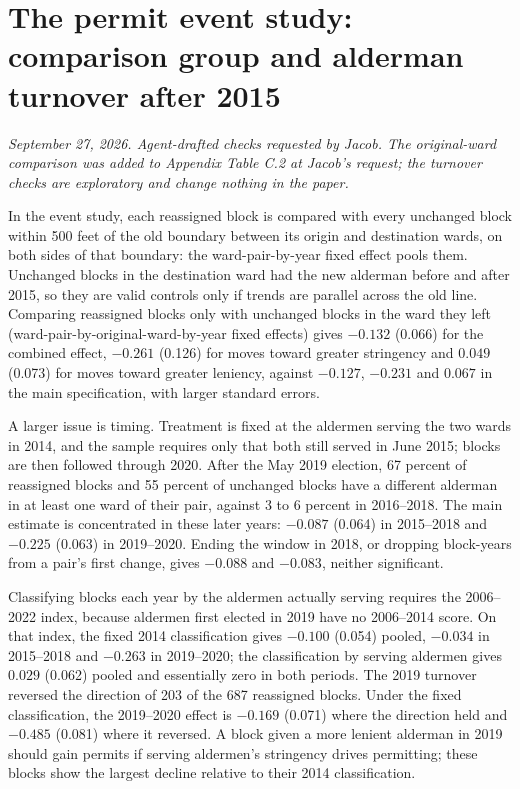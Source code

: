 \clearpage
\section*{The permit event study: comparison group and alderman turnover after 2015}
\textit{September 27, 2026. Agent-drafted checks requested by Jacob. The original-ward comparison was added to
Appendix Table C.2 at Jacob's request; the turnover checks are exploratory and change nothing in the paper.}

In the event study, each reassigned block is compared with every unchanged block within 500 feet of the old
boundary between its origin and destination wards, on both sides of that boundary: the ward-pair-by-year fixed
effect pools them. Unchanged blocks in the destination ward had the new alderman before and after 2015, so they are
valid controls only if trends are parallel across the old line. Comparing reassigned blocks only with unchanged
blocks in the ward they left (ward-pair-by-original-ward-by-year fixed effects) gives $-0.132$ (0.066) for the
combined effect, $-0.261$ (0.126) for moves toward greater stringency and $0.049$ (0.073) for moves toward greater
leniency, against $-0.127$, $-0.231$ and $0.067$ in the main specification, with larger standard errors.

A larger issue is timing. Treatment is fixed at the aldermen serving the two wards in 2014, and the sample requires
only that both still served in June 2015; blocks are then followed through 2020. After the May 2019 election, 67
percent of reassigned blocks and 55 percent of unchanged blocks have a different alderman in at least one ward of
their pair, against 3 to 6 percent in 2016--2018. The main estimate is concentrated in these later years: $-0.087$
(0.064) in 2015--2018 and $-0.225$ (0.063) in 2019--2020. Ending the window in 2018, or dropping block-years from a
pair's first change, gives $-0.088$ and $-0.083$, neither significant.

Classifying blocks each year by the aldermen actually serving requires the 2006--2022 index, because aldermen first
elected in 2019 have no 2006--2014 score. On that index, the fixed 2014 classification gives $-0.100$ (0.054) pooled,
$-0.034$ in 2015--2018 and $-0.263$ in 2019--2020; the classification by serving aldermen gives $0.029$ (0.062) pooled
and essentially zero in both periods. The 2019 turnover reversed the direction of 203 of the 687 reassigned blocks.
Under the fixed classification, the 2019--2020 effect is $-0.169$ (0.071) where the direction held and $-0.485$
(0.081) where it reversed. A block given a more lenient alderman in 2019 should gain permits if serving aldermen's
stringency drives permitting; these blocks show the largest decline relative to their 2014 classification.

